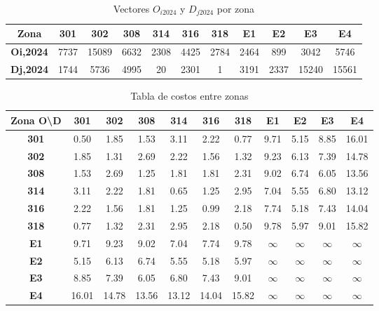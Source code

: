 \documentclass[letterpaper,12pt]{article}
\begin{document}
    
\begin{table}[h!]
    \centering
    \begin{tabular}{c|cccccccccc}
    \textbf{Zona} & \textbf{301} & \textbf{302} & \textbf{308} & \textbf{314} & \textbf{316} & \textbf{318} & \textbf{E1} & \textbf{E2} & \textbf{E3} & \textbf{E4} \\ \hline
    \textbf{Oi,2024} & 7737 & 15089 & 6632 & 2308 & 4425 & 2784 & 2464 & 899 & 3042 & 5746 \\ 
    \textbf{Dj,2024} & 1744 & 5736 & 4995 & 20 & 2301 & 1 & 3191 & 2337 & 15240 & 15561 \\ 
    \end{tabular}
    \caption{Vectores $O_{i2024}$ y $D_{j2024}$ por zona}
    \label{table:oi_dj_2024}
\end{table}


\begin{table}[h!]
    \centering
    \begin{tabular}{c|cccccccccc}
    \textbf{Zona O\textbackslash D} & \textbf{301} & \textbf{302} & \textbf{308} & \textbf{314} & \textbf{316} & \textbf{318} & \textbf{E1} & \textbf{E2} & \textbf{E3} & \textbf{E4} \\ \hline
    \textbf{301} & 0.50 & 1.85 & 1.53 & 3.11 & 2.22 & 0.77 & 9.71 & 5.15 & 8.85 & 16.01 \\ 
    \textbf{302} & 1.85 & 1.31 & 2.69 & 2.22 & 1.56 & 1.32 & 9.23 & 6.13 & 7.39 & 14.78 \\ 
    \textbf{308} & 1.53 & 2.69 & 1.25 & 1.81 & 1.81 & 2.31 & 9.02 & 6.74 & 6.05 & 13.56 \\ 
    \textbf{314} & 3.11 & 2.22 & 1.81 & 0.65 & 1.25 & 2.95 & 7.04 & 5.55 & 6.80 & 13.12 \\ 
    \textbf{316} & 2.22 & 1.56 & 1.81 & 1.25 & 0.99 & 2.18 & 7.74 & 5.18 & 7.43 & 14.04 \\ 
    \textbf{318} & 0.77 & 1.32 & 2.31 & 2.95 & 2.18 & 0.50 & 9.78 & 5.97 & 9.01 & 15.82 \\ 
    \textbf{E1} & 9.71 & 9.23 & 9.02 & 7.04 & 7.74 & 9.78 & $\infty$ & $\infty$ & $\infty$ & $\infty$ \\ 
    \textbf{E2} & 5.15 & 6.13 & 6.74 & 5.55 & 5.18 & 5.97 & $\infty$ & $\infty$ & $\infty$ & $\infty$ \\ 
    \textbf{E3} & 8.85 & 7.39 & 6.05 & 6.80 & 7.43 & 9.01 & $\infty$ & $\infty$ & $\infty$ & $\infty$ \\ 
    \textbf{E4} & 16.01 & 14.78 & 13.56 & 13.12 & 14.04 & 15.82 & $\infty$ & $\infty$ & $\infty$ & $\infty$ \\ 
    \end{tabular}
    \caption{Tabla de costos entre zonas}
    \label{table:costs_zones}
\end{table}
    
\end{document}
